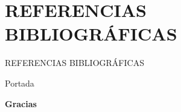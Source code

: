\section*{REFERENCIAS BIBLIOGRÁFICAS}
\begin{frame}[allowframebreaks]{REFERENCIAS BIBLIOGRÁFICAS} %
\begingroup %
\renewcommand{\color}[1]{} %
\footnotesize{} %

\endgroup %
\end{frame}
\begin{frame} %
	\begin{beamercolorbox}[ht=\paperheight,wd=\paperwidth, center]{Portada}
		\begin{center}\Huge\textbf{Gracias}\end{center} %
		
		\vspace{0.44\paperheight}
    \end{beamercolorbox}
\end{frame}

